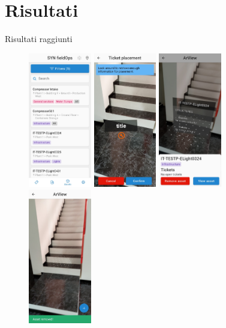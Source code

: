 \documentclass{beamer}
\begin{document}
\section{Risultati}
\begin{frame}{Risultati raggiunti}
 \begin{figure}[H]
    \centering
    \includegraphics[width=0.245\textwidth]{immagini/asset_list.jpg}\hfill
    \includegraphics[width=0.245\textwidth]{immagini/ticket_ar2.jpg}\hfill
    \includegraphics[width=0.245\textwidth]{immagini/asset_card_onTap.jpg}\hfill
    \includegraphics[width=0.245\textwidth]{immagini/remove_asset.jpg}

\end{figure}
\end{frame}
\end{document}
